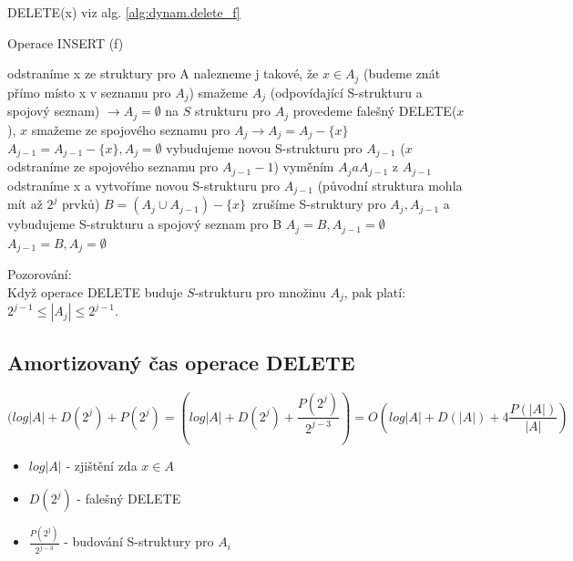 DELETE(x) viz alg. \ref{alg:dynam.delete_f}

\begin{algorithm}[!htb]
\caption{Operace INSERT (f)}
\label{alg:dynam.delete_f}
\begin{algorithmic}
  \STATE odstraníme x ze struktury pro A
  \STATE nalezneme j takové, že $x \in A_j$ (budeme znát přímo místo x v seznamu
  pro $A_j$)
    \STATE smažeme $A_j$ (odpovídající S-strukturu 
     a spojový seznam) $\rightarrow A_j = \emptyset$
  \ENDIF
    \STATE na $S$ strukturu pro $A_j$ provedeme falešný DELETE($x$), $x$ smažeme
    ze spojového seznamu pro $A_j \rightarrow A_j = A_j - \{x\}$
  \ENDIF  
       \STATE $A_{j-1} = A_{j-1} - \{x\}, A_j = \emptyset$
       \STATE vybudujeme novou S-strukturu pro $A_{j-1}$
       ($x$ odstraníme ze spojového seznamu pro $A_{j-1} - 1$)
    \ENDIF
      \STATE vyměním $A_j a A_{j-1}$
      \STATE z $A_{j-1}$ odstraníme x a vytvoříme novou S-strukturu pro
      $A_{j-1}$ (původní struktura mohla mít až $2^j$ prvků)
    \ENDIF
      \STATE $B = (A_j \cup A_{j-1}) - \{x\}$\
      \STATE zrušíme S-struktury pro $A_j, A_{j-1}$ a vybudujeme S-strukturu
      a spojový seznam pro B
        \STATE $A_j = B, A_{j-1} = \emptyset$
      \ELSE
        \STATE $A_{j-1} = B, A_j = \emptyset$
      \ENDIF	
    \ENDIF
  \ENDIF
\ENDIF  
\end{algorithmic}
\end{algorithm}

Pozorování: \\
Když operace DELETE buduje $S$-strukturu pro množinu $A_j$, pak platí:
$2^{j-1} \leq |A_j| \leq 2^{j-1}$.

\subsection{Amortizovaný čas operace DELETE}

$$
(log|A| + D(2^j) + P(2^j) =
(log|A| + D(2^j) + \frac{P(2^j)}{2^{j-3}}) = O(log|A| + D(|A|) +
4\frac{P(|A|)}{|A|})
$$

\begin{itemize}
\item $log|A|$ - zjištění zda $x \in A$ 
\item $D(2^j)$ - falešný DELETE 
\item $\frac{P(2^j)}{2^{j-3}}$ - budování S-struktury pro $A_i$
\end{itemize}

